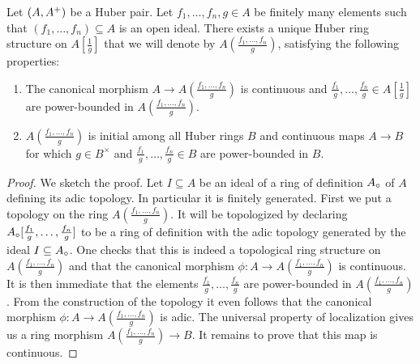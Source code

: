 \begin{prop}\label{localizationprop1}
Let $(A,A{^{+}})$ be a Huber pair. Let $f_1,\dots,f_n,g\in A$ be finitely many elements such that 
$(f_1,\dots,f_n)\subseteq A$ is an open ideal.
There exists a unique Huber ring structure on $A[\tfrac{1}{g}]$ that we will denote by $A(\tfrac{f_1,\dots,f_n}{g})$, satisfying the following properties:
\begin{enumerate}
\item The canonical morphism $A\to A(\tfrac{f_1,\dots,f_n}{g})$ is continuous and $\tfrac{f_1}{g},\dots,\tfrac{f_n}{g}\in A[\tfrac{1}{g}]$ are power-bounded in $A(\tfrac{f_1,\dots,f_n}{g})$.
\item $A(\tfrac{f_1,\dots,f_n}{g})$ is initial among all Huber rings $B$ and continuous maps $A\to B$ for which $g\in B^\times$ and $\tfrac{f_1}{g},\dots,\tfrac{f_n}{g}\in B$ are power-bounded in $B$.
\end{enumerate}
\end{prop}
\begin{proof}
We sketch the proof.  Let $I\subseteq A$ be an ideal of a ring of definition $A{_{\circ}}$ of $A$ defining its adic topology. In particular it is finitely generated.
First we put a topology on the ring $A(\tfrac{f_1,\dots,f_n}{g})$. It will be topologized by declaring $A{_{\circ}}[\tfrac{f_1}{g},\dots,\tfrac{f_n}{g}]$ to be a ring of definition with the adic topology generated by the ideal $I\subseteq A{_{\circ}}$. 
One checks that this is indeed a topological ring structure on $A(\tfrac{f_1,\dots,f_n}{g})$ and that the canonical morphism $\phi\colon A\to A(\tfrac{f_1,\dots,f_n}{g})$ is continuous. 
It is then immediate that the elements $\tfrac{f_1}{g},\dots,\tfrac{f_n}{g}$ are power-bounded in $A(\tfrac{f_1,\dots,f_n}{g})$. 
From the construction of the topology it even follows that the canonical morphism $\phi\colon A\to A(\tfrac{f_1,\dots,f_n}{g})$ is adic.
The universal property of localization gives us a ring morphism $A(\tfrac{f_1,\dots,f_n}{g})\to B$.
It remains to prove that this map is continuous.
\end{proof}

